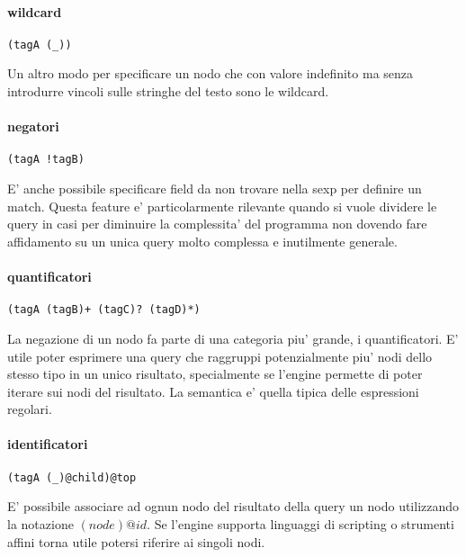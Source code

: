\paragraph{wildcard}

\begin{verbatim}
(tagA (_))
\end{verbatim}

Un altro modo per specificare un nodo che con valore indefinito ma senza introdurre vincoli sulle stringhe del testo sono le wildcard.

\paragraph{negatori}

\begin{verbatim}
(tagA !tagB)
\end{verbatim}

E' anche possibile specificare field da non trovare nella sexp per definire un match.
Questa feature e' particolarmente rilevante quando si vuole dividere le query in casi per diminuire la complessita' del programma non dovendo fare affidamento su un unica query molto complessa e inutilmente generale.

\paragraph{quantificatori}

\begin{verbatim}
(tagA (tagB)+ (tagC)? (tagD)*)
\end{verbatim}

La negazione di un nodo fa parte di una categoria piu' grande, i quantificatori.
E' utile poter esprimere una query che raggruppi potenzialmente piu' nodi dello stesso tipo in un unico risultato, specialmente se l'engine permette di poter iterare sui nodi del risultato.
La semantica e' quella tipica delle espressioni regolari.

\paragraph{identificatori}

\begin{verbatim}
(tagA (_)@child)@top
\end{verbatim}

E' possibile associare ad ognun nodo del risultato della query un nodo utilizzando la notazione $(node)@id$.
Se l'engine supporta linguaggi di scripting o strumenti affini torna utile potersi riferire ai singoli nodi.

